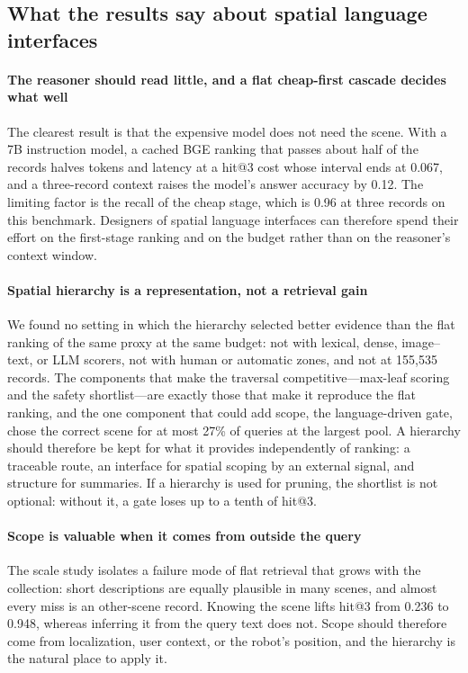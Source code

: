 \documentclass{ieeeaccess}
\begin{document}
\subsection{What the results say about spatial language interfaces}
\paragraph{The reasoner should read little, and a flat cheap-first cascade
decides what well}
The clearest result is that the expensive model does not need the scene. With a
7B instruction model, a cached BGE ranking that passes about half of the records
halves tokens and latency at a hit@3 cost whose interval ends at 0.067, and a
three-record context raises the model's answer accuracy by 0.12. The limiting
factor is the recall of the cheap stage, which is 0.96 at three records on this
benchmark. Designers of spatial language interfaces can therefore spend their
effort on the first-stage ranking and on the budget rather than on the reasoner's
context window.

\paragraph{Spatial hierarchy is a representation, not a retrieval gain}
We found no setting in which the hierarchy selected better evidence than the flat
ranking of the same proxy at the same budget: not with lexical, dense,
image--text, or LLM scorers, not with human or automatic zones, and not at 155,535
records. The components that make the traversal competitive---max-leaf scoring
and the safety shortlist---are exactly those that make it reproduce the flat
ranking, and the one component that could add scope, the language-driven gate,
chose the correct scene for at most 27\% of queries at the largest pool. A hierarchy
should therefore be kept for what it provides independently of ranking: a
traceable route, an interface for spatial scoping by an external signal, and
structure for summaries. If a hierarchy is used for pruning, the shortlist is not
optional: without it, a gate loses up to a tenth of hit@3.

\paragraph{Scope is valuable when it comes from outside the query}
The scale study isolates a failure mode of flat retrieval that grows with the
collection: short descriptions are equally plausible in many scenes, and almost
every miss is an other-scene record. Knowing the scene lifts hit@3 from 0.236 to
0.948, whereas inferring it from the query text does not. Scope should therefore
come from localization, user context, or the robot's position, and the hierarchy
is the natural place to apply it.
\end{document}

